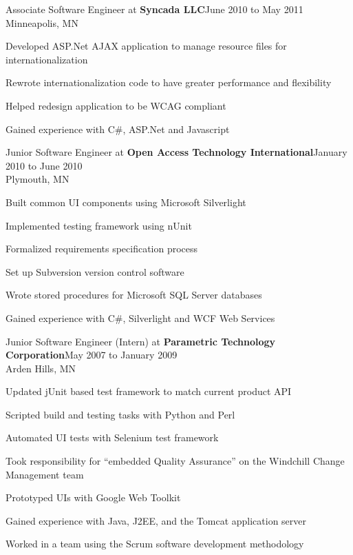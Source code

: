 \documentclass[letterpaper]{article}
\newenvironment{resume-list}
{\begin{itemize}
 \setlength{\itemsep}{0pt}
 \setlength{\parskip}{0pt}}
{\end{itemize}}
\begin{document}
\noindent Associate Software Engineer at {\bfseries Syncada LLC}\dotfill June 2010 to May 2011\\
Minneapolis, MN
\begin{resume-list}
\item Developed ASP.Net AJAX application to manage resource files for internationalization
\item Rewrote internationalization code to have greater performance and flexibility
\item Helped redesign application to be WCAG compliant
\item Gained experience with C\#, ASP.Net and Javascript
\end{resume-list}
\noindent Junior Software Engineer at {\bfseries Open Access Technology International}\dotfill January 2010 to June 2010\\
Plymouth, MN
\begin{resume-list}
\item Built common UI components using Microsoft Silverlight
\item Implemented testing framework using nUnit
\item Formalized requirements specification process
\item Set up Subversion version control software
\item Wrote stored procedures for Microsoft SQL Server databases
\item Gained experience with C\#, Silverlight and WCF Web Services
\end{resume-list}
\pagebreak
\noindent Junior Software Engineer (Intern) at {\bfseries Parametric Technology Corporation}\dotfill May 2007 to January 2009\\
Arden Hills, MN
\begin{resume-list}
\item Updated jUnit based test framework to match current product API
\item Scripted build and testing tasks with Python and Perl
\item Automated UI tests with Selenium test framework
\item Took responsibility for ``embedded Quality Assurance'' on the Windchill Change Management team
\item Prototyped UIs with Google Web Toolkit
\item Gained experience with Java, J2EE, and the Tomcat application server
\item Worked in a team using the Scrum software development methodology
\end{resume-list}
\end{document}

